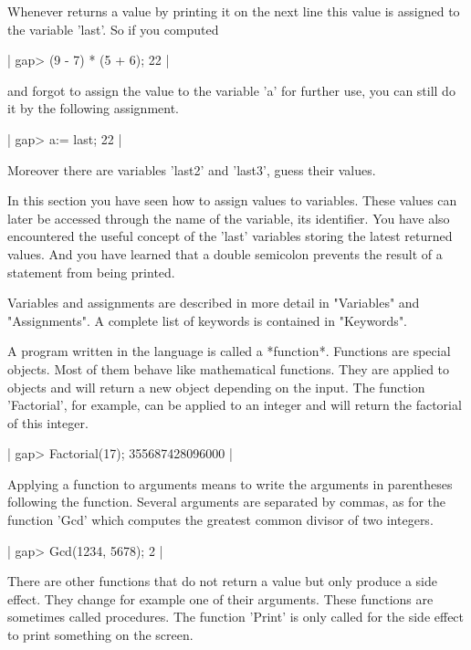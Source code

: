 Whenever {\GAP} returns   a value by printing  it  on the next line  this
value is assigned to the variable 'last'.  So if you computed

|    gap> (9 - 7) * (5 + 6);
    22 |

and forgot to assign the value to the variable  'a' for further use,  you
can still do it by the following assignment.

|    gap> a:= last;
    22 |

Moreover there are variables 'last2' and 'last3', guess their values.

In  this section you have seen how to assign values to  variables.  These
values  can  later  be accessed through  the  name of the  variable,  its
identifier.  You  have also encountered the useful concept  of the 'last'
variables storing the latest returned values.  And  you have learned that
a double semicolon prevents the result of a statement from being printed.

Variables and assignments are described in more detail in "Variables" and
"Assignments".  A complete list of keywords is contained in "Keywords".


A  program  written  in  the  {\GAP} language  is  called  a  *function*.
Functions  are   special  {\GAP}  objects.   Most  of  them  behave  like
mathematical functions.  They are applied to  objects and  will return  a
new  object  depending  on  the input.   The  function  'Factorial',  for
example,  can be applied to an  integer and will  return the factorial of
this integer.

|    gap> Factorial(17);
    355687428096000 |

Applying  a  function  to arguments  means  to  write  the  arguments  in
parentheses following the function.   Several arguments are  separated by
commas, as for the  function  'Gcd' which  computes  the greatest  common
divisor of two integers.

|    gap> Gcd(1234, 5678);
    2 |

There are other functions that do not return a value but  only  produce a
side effect.  They  change for  example  one of  their  arguments.  These
functions are sometimes called procedures.  The function 'Print' is  only
called for the side effect to print something on the screen.

